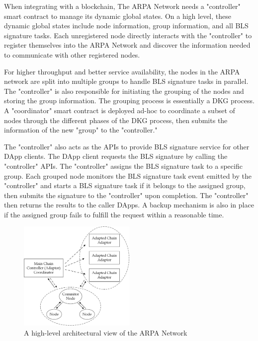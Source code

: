 \documentclass[11pt]{article}
\begin{document}
When integrating with a blockchain, The ARPA Network needs a "controller" smart contract to manage its dynamic global states. On a high level, these dynamic global states include node information, group information, and all BLS signature tasks. Each unregistered node directly interacts with the "controller" to register themselves into the ARPA Network and discover the information needed to communicate with other registered nodes.

For higher throughput and better service availability, the nodes in the ARPA network are split into multiple groups to handle BLS signature tasks in parallel. The "controller" is also responsible for initiating the grouping of the nodes and storing the group information. The grouping process is essentially a DKG process. A "coordinator" smart contract is deployed ad-hoc to coordinate a subset of nodes through the different phases of the DKG process, then submits the information of the new "group" to the "controller."

The "controller" also acts as the APIs to provide BLS signature service for other DApp clients. The DApp client requests the BLS signature by calling the "controller" APIs. The "controller" assigns the BLS signature task to a specific group. Each grouped node monitors the BLS signature task event emitted by the "controller" and starts a BLS signature task if it belongs to the assigned group, then submits the signature to the "controller" upon completion. The "controller" then returns the results to the caller DApps. A backup mechanism is also in place if the assigned group fails to fulfill the request within a reasonable time.

\begin{figure}
    \centering
    \includegraphics[width=0.5\textwidth]{figures/arpa network high level architecture.png}
    \caption{A high-level architectural view of the ARPA Network}
    \label{fig:arch}
\end{figure}
\end{document}
